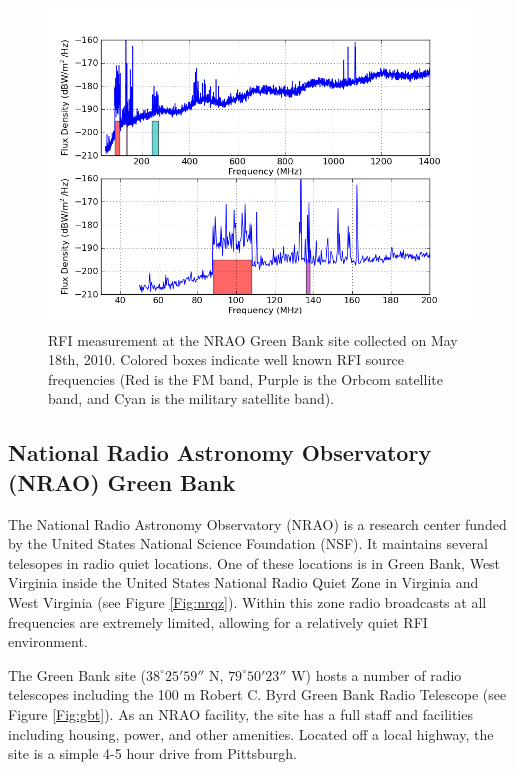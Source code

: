 \begin{figure}[htb]
\begin{center}
\includegraphics[width=0.9\linewidth]{RFI_testing/figures/GBT_bands.png}
\caption{RFI measurement at the NRAO Green Bank site collected on May 18th, 2010. Colored boxes indicate well known RFI source frequencies (Red is the FM band, Purple is the Orbcom satellite band, and Cyan is the military satellite band). }
\label{Fig:gbtrfi}
\end{center}
\end{figure}

\subsection{National Radio Astronomy Observatory (NRAO) Green Bank}

The National Radio Astronomy Observatory (NRAO) is a research center funded by the United States National Science Foundation (NSF). It maintains several telesopes in radio quiet locations. One of these locations is in Green Bank, West Virginia inside the United States National Radio Quiet Zone in Virginia and West Virginia (see Figure \ref{Fig:nrqz}). Within this zone radio broadcasts at all frequencies are extremely limited, allowing for a relatively quiet RFI environment. 

The Green Bank site ($38^\circ 25' 59''$ N, $79^\circ 50' 23''$ W) hosts a number of radio telescopes including the 100 m Robert C. Byrd Green Bank Radio Telescope (see Figure \ref{Fig:gbt}). As an NRAO facility, the site has a full staff and facilities including housing, power, and other amenities. Located off a local highway, the site is a simple 4-5 hour drive from Pittsburgh. 

